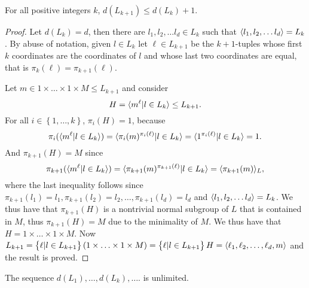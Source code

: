 \begin{theorem}
    \label{S2:bounddLk}
    For all positive integers $k$, $d(L_{k+1}) \le d(L_k) + 1$.    
\end{theorem}
\begin{proof}
    Let $d(L_k) = d$, then there are $l_1, l_2, \ldots  l_d \in L_k$ such that $\langle l_1, l_2, \ldots  l_d \rangle = L_k$. By abuse of notation, given $l \in L_k$ let $\ell \in L_{k+1}$ be the $k+1$-tuples whose first $k$ coordinates are the coordinates of $l$ and whose last two coordinates are equal, that is $\pi_k(\ell) = \pi_{k+1}(\ell)$. 
        
    Let $m \in 1 \times \ldots  \times 1 \times M \le L_{k+1}$ and consider
    $$H = \langle m^\ell | l \in L_k \rangle \le L_{k+1}.$$
    For all $i \in \left\{1, \ldots , k \right\}$, $\pi_i(H) = 1$, because
    $$\pi_i(\langle m^\ell | l \in L_k \rangle) = \langle \pi_i(m)^{\pi_i(\ell)} | l \in L_k \rangle = \langle 1^{\pi_i(\ell)} | l \in L_k \rangle = 1.$$ 
    And $\pi_{k+1}(H) = M$ since
    $$\pi_{k+1}(\langle m^\ell | l \in L_k \rangle) = \langle \pi_{k+1}(m)^{\pi_{k+1}(\ell)} | l \in L_k \rangle = \langle \pi_{k+1}(m) \rangle_L,$$
    where the last inequality follows since $\pi_{k+1}(l_1) = l_1, \pi_{k+1}(l_2) = l_2, \ldots , \pi_{k+1}(l_d) = l_d$ and $\langle l_1, l_2, \ldots  l_d \rangle = L_k$. We thus have that $\pi_{k+1}(H)$ is a nontrivial normal subgroup of $L$ that is contained in $M$, thus $\pi_{k+1}(H) = M$ due to the minimality of $M$. We thus have that $H = 1 \times \ldots  \times 1 \times M$.
    Now $L_{k+1} = \left\{ \ell | l \in L_{k+1} \right\}(1 \times \ldots  \times 1 \times M) = \left\{ \ell | l \in L_{k+1} \right\} H = \langle \ell_1, \ell_2, \ldots  , \ell_d, m \rangle$
    and the result is proved.
    
\end{proof}

\begin{theorem}
    \label{S2:undLk}
    The sequence $d(L_1),\ldots ,d(L_k), \ldots .$ is unlimited.
\end{theorem}

